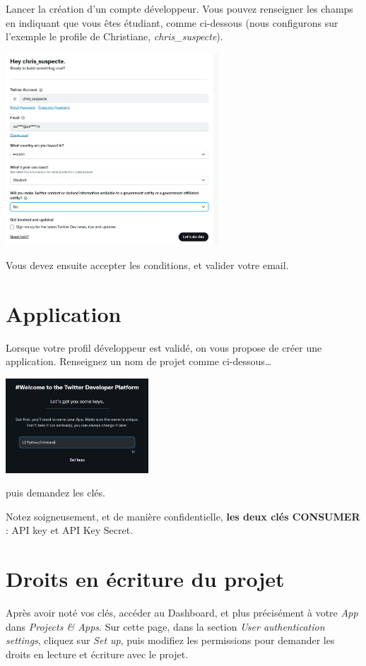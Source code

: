 \documentclass[11pt,a4paper]{article}
\begin{document}
Lancer la création d'un compte développeur. Vous pouvez renseigner les champs en indiquant que vous êtes étudiant, comme ci-dessous (nous configurons sur l'exemple le profile de Christiane, \emph{chris\_suspecte}). 

\begin{center}
    \includegraphics[width=0.6\textwidth]{etapes_cle/step2.jpg}
\end{center}

Vous devez ensuite accepter les conditions, et valider votre email. 
\newpage
\section{Application}

Lorsque votre profil développeur est validé, on vous propose de créer une application. Renseignez un nom de projet comme ci-dessous\dots
\begin{center}
    \includegraphics[width=0.4\textwidth]{etapes_cle/step3.jpg}
\end{center}
puis demandez les clés. 

Notez soigneusement, et de manière confidentielle, \textbf{les deux clés CONSUMER} : API key et API Key Secret.

\section{Droits en écriture du projet}
Après avoir noté vos clés, accéder au Dashboard, et plus précisément à votre \emph{App} dans \emph{Projects \& Apps}.
Sur cette page, dans la section \emph{User authentication settings}, cliquez sur \emph{Set up}, puis modifiez les permissions pour demander les droits en lecture et écriture avec le projet. 
\end{document}

